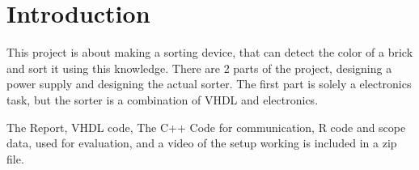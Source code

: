 \section{Introduction}
This project is about making a sorting device, that can detect the color of a brick and sort it using this knowledge. 
There are 2 parts of the project, designing a power supply and designing the actual sorter. 
The first part is solely a electronics task, but the sorter is a combination of VHDL and electronics. 

The Report,
VHDL code, 
The C++ Code for communication, 
R code and scope data, used for evaluation,
and a video of the setup working is included in a zip file.